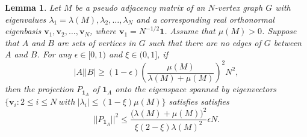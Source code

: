 \documentclass[10pt,a4paper]{amsart}
\numberwithin{equation}{section}
\newtheorem{lemma}[theorem]{Lemma}
\def\v{\mathbf{v}}
\def\1{\mathbf{1}}
\begin{document}
\begin{lemma}\label{CrossHDboundStability}
Let $M$ be a pseudo adjacency matrix of an $N$-vertex graph $G$
with eigenvalues $\lambda_1=\lambda(M), \lambda_2, \ldots , \lambda_N$ and a corresponding real orthonormal eigenbasis
$\v_1,\v_2, \ldots ,\v_N$, where $\v_1=N^{-1/2}\1$.
Assume that $\mu(M)>0$.
Suppose that $A$ and $B$ are sets of vertices in $G$ such
that there are no edges of $G$ between $A$ and $B$.
For any $\epsilon \in [0,1)$ and $\xi\in (0,1]$,
if
$$ |A||B| \geq (1-\epsilon)\left(\frac{\mu (M)}{\lambda (M)+\mu (M)}\right)^2N^2,$$
then the projection $P_{\1_A}$ of $\1_A$ onto the eigenspace spanned by eigenvectors $\{\v_i: 2\leq i\leq N ~with~ |\lambda_i|\leq (1-\xi)\mu(M) \}$
satisfies
satisfies
$$||P_{\1_A}||^2\leq
\frac{\big(\lambda(M) + \mu(M)\big)^2 }{ \xi(2-\xi)\lambda(M) ^2} \epsilon  N.$$
\end{lemma}
\end{document}

